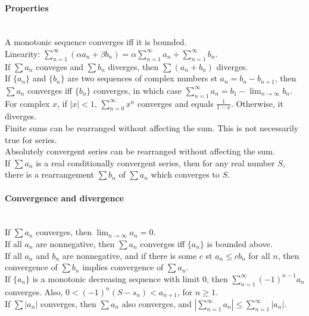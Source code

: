 \documentclass[10pt]{article}
\begin{document}
\paragraph{Properties}\ \\
A monotonic sequence converges iff it is bounded.\\
Linearity: $\sum_{n=1}^\infty(\alpha a_n + \beta b_n) = \alpha \sum_{n=1}^\infty a_n + \sum_{n=1}^\infty b_n$.\\
If $\sum a_n$ conveges and $\sum b_n$ diverges, then $\sum(a_n+b_n)$ diverges.\\
If $\{a_n\}$ and $\{b_n\}$ are two sequences of complex numbers st $a_n = b_n - b_{n+1}$, then
$\sum a_n$ converges iff $\{b_n\}$ converges, in which case $\sum_{n=1}^\infty a_n=b_1-\lim_{n \to \infty} b_n$.\\
For complex $x$, if $|x|<1$, $\sum_{n=0}^\infty x^n$ converges and equals $\frac{1}{1-x}$. Otherwise, it diverges.\\
Finite sums can be rearranged without affecting the sum. This is not necessarily true for series.\\
Absolutely convergent series can be rearranged without affecting the sum.\\
If $\sum a_n$ is a real conditionally convergent series, then for any real number $S$, there is a 
rearrangement $\sum b_n$ of $\sum a_n$ which converges to $S$.

\paragraph{Convergence and divergence}\ \\
If $\sum a_n$ converges, then $\lim_{n\to\infty} a_n = 0$.\\
If all $a_n$ are nonnegative, then $\sum a_n$ converges iff $\{a_n\}$ is bounded above.\\
If all $a_n$ and $b_n$ are nonnegative, and if there is some $c$ st $a_n\leq cb_n$ for all $n$,
then convergence of $\sum b_n$ implies convergence of $\sum a_n$.\\
If $\{a_n\}$ is a monotonic decreasing sequence with limit $0$, then $\sum_{n=1}^\infty(-1)^{n-1}a_n$ converges.
Also, $0 < (-1)^n(S-s_n)<a_{n+1}$, for $n\geq 1$.\\
If $\sum |a_n|$ converges, then $\sum a_n$ also converges, and $\left|\sum_{n=1}^\infty a_n\right|\leq\sum_{n=1}^\infty |a_n|$.
\end{document}
